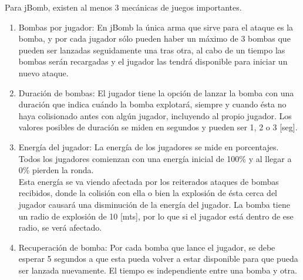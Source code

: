 \documentclass[a4paper,12pt,openany,oneside]{book}
\begin{document}
Para jBomb, existen al menos 3 mecánicas de juegos importantes.
\begin{enumerate}
\item Bombas por jugador: En jBomb la única arma que sirve para el ataque es la bomba, y por cada jugador sólo pueden haber un máximo de 3 bombas que pueden ser lanzadas seguidamente una tras otra, al cabo de un tiempo las bombas serán recargadas y el jugador las tendrá disponible para iniciar un nuevo ataque.
\item Duración de bombas: El jugador tiene la opción de lanzar la bomba con una duración que indica cuándo la bomba explotará, siempre y cuando ésta no haya colisionado antes con algún jugador, incluyendo al propio jugador. Los valores posibles de duración se miden en segundos y pueden ser 1, 2 o 3 [seg].
\item Energía del jugador: La energía de los jugadores se mide en porcentajes. Todos los jugadores comienzan con una energía inicial de 100\% y al llegar a 0\% pierden la ronda.\\		
Esta energía se va viendo afectada por los reiterados ataques de bombas recibidos, donde la colisión con ella o bien la explosión de ésta cerca del jugador causará una disminución de la energía del jugador. La bomba tiene un radio de explosión de 10 [mts], por lo que si el jugador está dentro de ese radio, se verá afectado.
\item Recuperación de bomba: Por cada bomba que lance el jugador, se debe esperar 5 segundos a que esta pueda volver a estar disponible para que pueda ser lanzada nuevamente. El tiempo es independiente entre una bomba y otra.
\end{enumerate}
\end{document}
